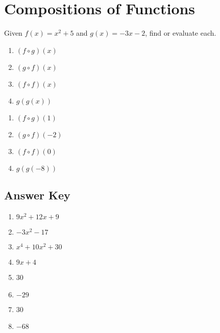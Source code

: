 \chapter{Compositions of Functions}

Given $f(x) = x^2 + 5$ and $g(x) = -3x-2$, find or evaluate each.

\begin{multicols}{4}
\begin{enumerate}
	\item $(f \circ g)(x)$
	\item $(g \circ f)(x)$
	\item $(f \circ f)(x)$
	\item $g(g(x))$
\end{enumerate}	\setcounter{Review}{\value{enumi}}
\end{multicols}
\begin{multicols}{4}
\begin{enumerate}		\setcounter{enumi}{\value{Review}}
	\item $(f \circ g)(1)$
	\item $(g \circ f)(-2)$
	\item $(f \circ f)(0)$
	\item $g(g(-8))$
\end{enumerate}	\setcounter{Review}{\value{enumi}}
\end{multicols}

\newpage

\section*{Answer Key}

\begin{enumerate}
	\item $9x^2+12x+9$
    \item $-3x^2-17$
    \item $x^4+10x^2+30$
    \item $9x+4$
    \item 30
    \item $-29$
    \item 30
    \item $-68$
\end{enumerate}